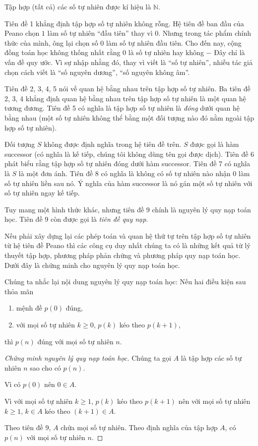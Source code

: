 Tập hợp (tất cả) các số tự nhiên được kí hiệu là $\mathbb{N}$.

Tiên đề 1 khẳng định tập hợp số tự nhiên không rỗng. Hệ tiên đề ban đầu của Peano chọn $1$ làm số tự nhiên ``đầu tiên'' thay vì $0$. Nhưng trong tác phẩm chính thức của mình, ông lại chọn số $0$ làm số tự nhiên đầu tiên. Cho đến nay, cộng đồng toán học không thống nhất rằng $0$ là số tự nhiên hay không $-$ Đây chỉ là vấn đề quy ước. Vì sự nhập nhằng đó, thay vì viết là ``số tự nhiên'', nhiều tác giả chọn cách viết là ``số nguyên dương'', ``số nguyên không âm''.

Tiên đề 2, 3, 4, 5 nói về quan hệ bằng nhau trên tập hợp số tự nhiên. Ba tiên đề 2, 3, 4 khẳng định quan hệ bằng nhau trên tập hợp số tự nhiên là một quan hệ tương đương. Tiên đề 5 có nghĩa là tập hợp số tự nhiên là \textit{đóng} dưới quan hệ bằng nhau (một số tự nhiên không thể bằng một đối tượng nào đó nằm ngoài tập hợp số tự nhiên).

Đối tượng $S$ không được định nghĩa trong hệ tiên đề trên. $S$ được gọi là hàm successor (có nghĩa là kế tiếp, chúng tôi không dùng tên gọi được dịch). Tiên đề 6 phát biểu rằng tập hợp số tự nhiên đóng dưới hàm successor. Tiên đề 7 có nghĩa là $S$ là một đơn ánh. Tiên đề 8 có nghĩa là không có số tự nhiên nào nhận $0$ làm số tự nhiên liền sau nó. Ý nghĩa của hàm successor là nó gán một số tự nhiên với số tự nhiên ngay kế tiếp.

Tuy mang một hình thức khác, nhưng tiên đề 9 chính là nguyên lý quy nạp toán học. Tiên đề 9 còn được gọi là \textit{tiên đề quy nạp}.

Nếu phải xây dựng lại các phép toán và quan hệ thứ tự trên tập hợp số tự nhiên từ hệ tiên đề Peano thì các công cụ duy nhất chúng ta có là những kết quả từ lý thuyết tập hợp, phương pháp phản chứng và phương pháp quy nạp toán học. Dưới đây là chứng minh cho nguyên lý quy nạp toán học.

Chúng ta nhắc lại nội dung nguyên lý quy nạp toán học: Nếu hai điều kiện sau thỏa mãn
\begin{enumerate}[label={(\roman*)},itemsep=0pt]
    \item mệnh đề $p(0)$ đúng,
    \item với mọi số tự nhiên $k\geq 0$, $p(k)$ kéo theo $p(k+1)$,
\end{enumerate}

thì $p(n)$ đúng với mọi số tự nhiên $n$.

\begin{proof}[Chứng minh nguyên lý quy nạp toán học]
    Chúng ta gọi $A$ là tập hợp các số tự nhiên $n$ sao cho có $p(n)$.

    Vì có $p(0)$ nên $0\in A$.

    Vì với mọi số tự nhiên $k\geq 1$, $p(k)$ kéo theo $p(k+1)$ nên với mọi số tự nhiên $k\geq 1$, $k\in A$ kéo theo $(k+1)\in A$.

    Theo tiên đề 9, $A$ chứa mọi số tự nhiên. Theo định nghĩa của tập hợp $A$, có $p(n)$ với mọi số tự nhiên $n$.
\end{proof}

